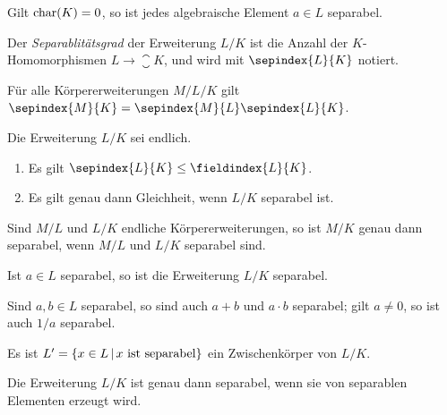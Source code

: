 \begin{example}
  Gilt $\operatorname{char}(K) = 0$, so ist jedes algebraische Element $a \in L$ separabel.
\end{example}

\begin{definition}
  Der \emph{Separablitätsgrad} der Erweiterung $L/K$ ist die Anzahl der $K$-Homomorphismen $L \to \closure{K}$, und wird mit $\sepindex{L}{K}$ notiert.
\end{definition}

\begin{lemma}
  Für alle Körpererweiterungen $M/L/K$ gilt $\sepindex{M}{K} = \sepindex{M}{L} \sepindex{L}{K}$.
\end{lemma}

\begin{proposition}
  Die Erweiterung $L/K$ sei endlich.
  \begin{enumerate}
    \item
      Es gilt $\sepindex{L}{K} \leq \fieldindex{L}{K}$.
    \item
      Es gilt genau dann Gleichheit, wenn $L/K$ separabel ist.
  \end{enumerate}
\end{proposition}

\begin{corollary}
  Sind $M/L$ und $L/K$ endliche Körpererweiterungen, so ist $M/K$ genau dann separabel, wenn $M/L$ und $L/K$ separabel sind.
\end{corollary}

\begin{lemma}
    Ist $a \in L$ separabel, so ist die Erweiterung $L/K$ separabel.
\end{lemma}

\begin{corollary}
  Sind $a, b \in L$ separabel, so sind auch $a + b$ und $a \cdot b$ separabel;
  gilt $a \neq 0$, so ist auch $1/a$ separabel.
\end{corollary}

\begin{corollary}
  Es ist $L' = \{x \in L \suchthat \text{$x$ ist separabel}\}$ ein Zwischenkörper von $L/K$.
\end{corollary}

\begin{corollary}
  Die Erweiterung $L/K$ ist genau dann separabel, wenn sie von separablen Elementen erzeugt wird.
\end{corollary}

